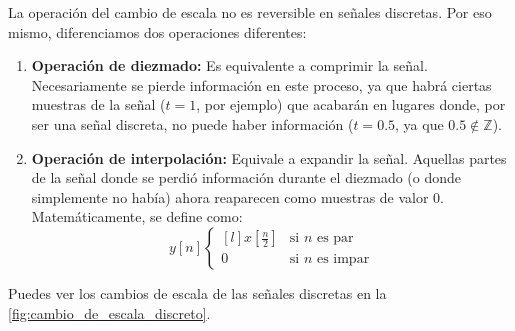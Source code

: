 \documentclass[a4paper]{book}
\begin{document}
La operación del cambio de escala no es reversible en señales discretas. Por eso mismo, diferenciamos dos operaciones diferentes:
\begin{enumerate}
\item \textbf{Operación de diezmado:} Es equivalente a comprimir la señal. Necesariamente se pierde información en este proceso, ya que habrá ciertas muestras de la señal ($t=1$, por ejemplo) que acabarán en lugares donde, por ser una señal discreta, no puede haber información ($t=0.5$, ya que $0.5 \not \in \mathbb{Z}$).
\item \textbf{Operación de interpolación:} Equivale a expandir la señal. Aquellas partes de la señal donde se perdió información durante el diezmado (o donde simplemente no había) ahora reaparecen como muestras de valor 0. Matemáticamente, se define como: \[y[n] \left\{ \begin{matrix*}[l]
x\left[ \frac{n}{2} \right] & \text{si } n \text{ es par} \\
0 & \text{si } n \text{ es impar}
\end{matrix*} \right. \]
\end{enumerate}

Puedes ver los cambios de escala de las señales discretas en la \autoref{fig:cambio_de_escala_discreto}.
\end{document}
